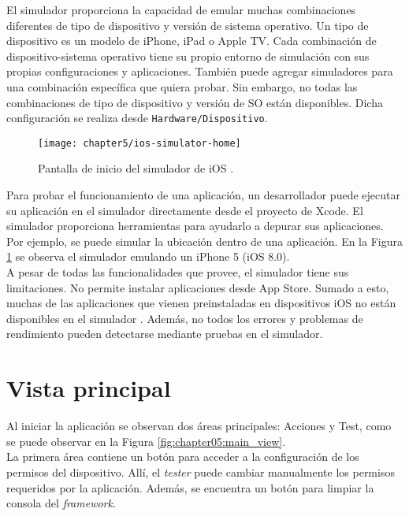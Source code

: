 El simulador proporciona la capacidad de emular muchas combinaciones diferentes de tipo de dispositivo y versión de sistema operativo. Un tipo de dispositivo es un modelo de iPhone, iPad o Apple TV. Cada combinación de dispositivo-sistema operativo tiene su propio entorno de simulación con sus propias configuraciones y aplicaciones. También puede agregar simuladores para una combinación específica que quiera probar. Sin embargo, no todas las combinaciones de tipo de dispositivo y versión de SO están disponibles. Dicha configuración se realiza desde \texttt{Hardware/Dispositivo}.\\
\begin{figure}[tbp]
    \centering
	\texttt{[image: chapter5/ios-simulator-home]}
	\caption{Pantalla de inicio del simulador de iOS \cite{iosds}.}
    \label{fig:ch05:ios-simulator-home}
\end{figure}

Para probar el funcionamiento de una aplicación, un desarrollador puede ejecutar su aplicación en el simulador directamente desde el proyecto de Xcode. El simulador proporciona herramientas para ayudarlo a depurar sus aplicaciones. Por ejemplo, se puede simular la ubicación dentro de una aplicación. En la Figura \ref{fig:ch05:ios-simulator-home} se observa el simulador emulando un iPhone 5 (iOS 8.0).\\

A pesar de todas las funcionalidades que provee, el simulador tiene sus limitaciones. No permite instalar aplicaciones desde App Store. Sumado a esto, muchas de las aplicaciones que vienen preinstaladas en dispositivos iOS no están disponibles en el simulador \cite{iosds}. Además, no todos los errores y problemas de rendimiento pueden detectarse mediante pruebas en el simulador.
\newpage
\section{Vista principal} \label{sec:main-view}
Al iniciar la aplicación se observan dos áreas principales: Acciones y Test, como se puede observar en la Figura \ref{fig:chapter05:main_view}.\\

La primera área contiene un botón para acceder a la configuración de los permisos del dispositivo. Allí, el \textit{tester} puede cambiar manualmente los permisos requeridos por la aplicación. Además, se encuentra un botón para limpiar la consola del \textit{framework}.\\

